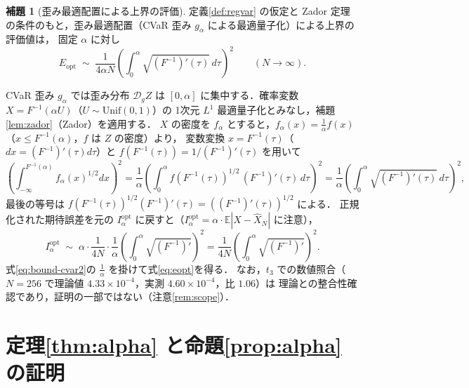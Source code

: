 \documentclass[a4paper,10pt]{jsarticle}
\makeatletter
\theoremstyle{definition}
\newtheorem{lemma}{補題}[section]
\renewenvironment{proof}[1][\proofname]{\par
  \pushQED{\qed}%
  \normalfont \topsep6\p@\@plus6\p@\relax
  \trivlist
  \item[\hskip\labelsep\textbf{#1}]\ignorespaces
}{%
  \popQED\endtrivlist\@endpefalse
}
\renewcommand{\proofname}{証明}
\newcommand{\Finv}{F^{-1}}
\newcommand{\E}{\mathbb{E}}
\newcommand{\dist}{\mathcal{D}_g}
\makeatother
\begin{document}
\begin{lemma}[歪み最適配置による上界の評価]
\label{lem:opt}
定義\ref{def:regvar} の仮定と Zador 定理の条件のもと，歪み最適配置（CVaR 歪み $g_\alpha$ による最適量子化）による上界の評価値は，
固定 $\alpha$ に対し
\begin{equation}
  E_{\mathrm{opt}}\;\sim\;\frac1{4\alpha N}\left(\int_0^\alpha\sqrt{(\Finv)'(\tau)}\,d\tau\right)^{2}
  \qquad(N\to\infty).
  \label{eq:eopt}
\end{equation}
\end{lemma}
\begin{proof}
CVaR 歪み $g_\alpha$ では歪み分布 $\dist Z$ は $[0,\alpha]$ に集中する．確率変数 $X=\Finv(\alpha U)$（$U\sim\mathrm{Unif}(0,1)$）の
1次元 $L^1$ 最適量子化とみなし，補題\ref{lem:zador}（Zador）を適用する．
$X$ の密度を $f_\alpha$ とすると，$f_\alpha(x)=\frac1\alpha f(x)$（$x\le\Finv(\alpha)$，$f$ は $Z$ の密度）より，
変数変換 $x=\Finv(\tau)$（$dx=(\Finv)'(\tau)d\tau$）と $f(\Finv(\tau))=1/(\Finv)'(\tau)$ を用いて
\begin{equation*}
\left(\int_{-\infty}^{\Finv(\alpha)}f_\alpha(x)^{1/2}dx\right)^{2}
=\frac1\alpha\left(\int_0^\alpha f(\Finv(\tau))^{1/2}\,(\Finv)'(\tau)\,d\tau\right)^{2}
=\frac1\alpha\left(\int_0^\alpha\sqrt{(\Finv)'(\tau)}\,d\tau\right)^{2},
\end{equation*}
最後の等号は $f(\Finv(\tau))^{1/2}(\Finv)'(\tau)=((\Finv)'(\tau))^{1/2}$ による．
正規化された期待誤差を元の $I_\alpha^{\mathrm{opt}}$ に戻すと（$I_\alpha^{\mathrm{opt}}=\alpha\cdot\E|X-\hat X_N|$ に注意），
\begin{equation*}
I_\alpha^{\mathrm{opt}}\;\sim\;\alpha\cdot\frac1{4N}\cdot\frac1\alpha\left(\int_0^\alpha\sqrt{(\Finv)'}\right)^{2}
=\frac1{4N}\left(\int_0^\alpha\sqrt{(\Finv)'}\right)^{2}.
\end{equation*}
式\eqref{eq:bound-cvar2}の $\frac1\alpha$ を掛けて式\eqref{eq:eopt}を得る．
なお，$t_3$ での数値照合（$N=256$ で理論値 $4.33\times10^{-4}$，実測 $4.60\times10^{-4}$，比 $1.06$）は
理論との整合性確認であり，証明の一部ではない（注意\ref{rem:scope}）．
\end{proof}

\section{定理\ref{thm:alpha} と命題\ref{prop:alpha} の証明}
\end{document}
